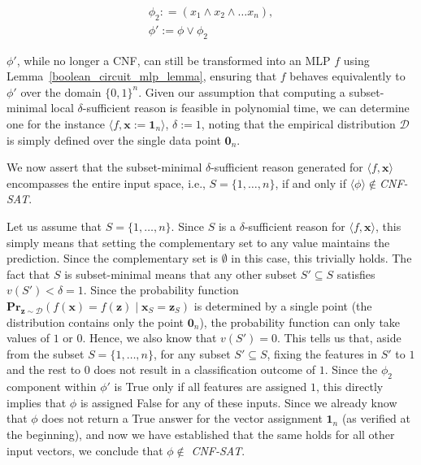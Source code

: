 \documentclass{article}
\newcommand{\z}{\textbf{z}}
\newcommand{\x}{\textbf{x}}
\begin{document}

 \begin{equation}
 \begin{aligned}
 \phi_2: = (x_1 \wedge x_2 \wedge \ldots x_n), \\
          \phi':=\phi \vee \phi_2
 \end{aligned}
 \end{equation}

 $\phi'$, while no longer a CNF, can still be transformed into an MLP $f$ using Lemma~\ref{boolean_circuit_mlp_lemma}, ensuring that $f$ behaves equivalently to $\phi'$ over the domain $\{0,1\}^n$. Given our assumption that computing a subset-minimal local $\delta$-sufficient reason is feasible in polynomial time, we can determine one for the instance $\langle f,\x:=\mathbf{1}_n\rangle$, $\delta:=1$, noting that the empirical distribution $\mathcal{D}$ is simply defined over the single data point $\mathbf{0}_n$.

We now assert that the subset-minimal $\delta$-sufficient reason generated for $\langle f, \x \rangle$ encompasses the entire input space, i.e., $S = \{1, \ldots, n\}$, if and only if $\langle \phi \rangle \not\in$\emph{CNF-SAT}.


Let us assume that $S = \{1, \ldots, n\}$. Since $S$ is a $\delta$-sufficient reason for $\langle f, \x \rangle$, this simply means that setting the complementary set to any value maintains the prediction. Since the complementary set is $\emptyset $ in this case, this trivially holds. The fact that $S$ is subset-minimal means that any other subset $S' \subseteq S$ satisfies $v(S') < \delta = 1$. Since the probability function $\textbf{Pr}_{\z\sim \mathcal{D}}(f(\x) = f(\z) \mid \x_S = \z_S)$ is determined by a single point (the distribution contains only the point $\mathbf{0}_n$), the probability function can only take values of $1$ or $0$. Hence, we also know that $v(S') = 0$. This tells us that, aside from the subset $S = \{1, \ldots, n\}$, for any subset $S' \subseteq S$, fixing the features in $ S'$ to  $1$ and the rest to $0$ does not result in a classification outcome of $1$. Since the $\phi_2$ component within $\phi'$ is True only if all features are assigned $ 1$, this directly implies that $ \phi $ is assigned False for any of these inputs. Since we already know that $ \phi$ does not return a True answer for the vector assignment $ \mathbf{1}_n $ (as verified at the beginning), and now we have established that the same holds for all other input vectors, we conclude that $ \phi \not\in $ \emph{CNF-SAT}.
\end{document}
